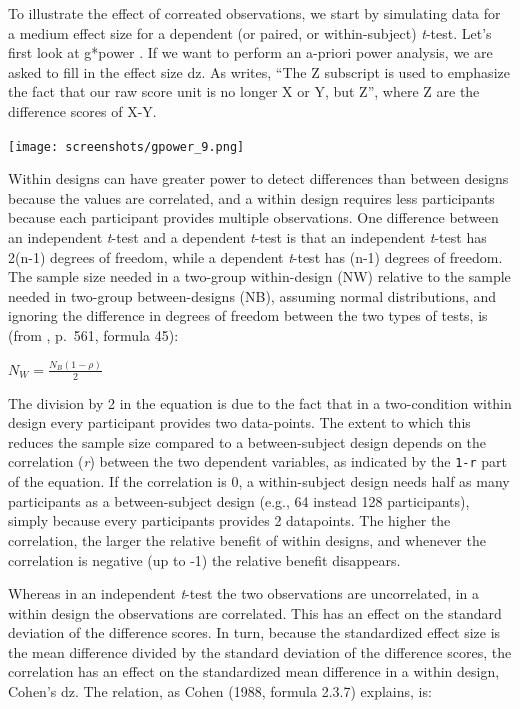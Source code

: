 \documentclass[
]{book}
\begin{document}
To illustrate the effect of correated observations, we start by simulating data for a medium effect size for a dependent (or paired, or within-subject) \emph{t}-test. Let's first look at g*power \citet{faul2007g}. If we want to perform an a-priori power analysis, we are asked to fill in the effect size dz. As \citet{cohen1988spa} writes, ``The Z subscript is used to emphasize the fact that our raw score unit is no longer X or Y, but Z'', where Z are the difference scores of X-Y.

\texttt{[image: screenshots/gpower\_9.png]}

Within designs can have greater power to detect differences than between designs because the values are correlated, and a within design requires less participants because each participant provides multiple observations. One difference between an independent \emph{t}-test and a dependent \emph{t}-test is that an independent \emph{t}-test has 2(n-1) degrees of freedom, while a dependent \emph{t}-test has (n-1) degrees of freedom. The sample size needed in a two-group within-design (NW) relative to the sample needed in two-group between-designs (NB), assuming normal distributions, and ignoring the difference in degrees of freedom between the two types of tests, is (from \citet{maxwell_designing_2004}, p.~561, formula 45):

\(N_{W}=\frac{N_{B}(1-\rho)}{2}\)

The division by 2 in the equation is due to the fact that in a two-condition within design every participant provides two data-points. The extent to which this reduces the sample size compared to a between-subject design depends on the correlation (\emph{r}) between the two dependent variables, as indicated by the \texttt{1-r} part of the equation. If the correlation is 0, a within-subject design needs half as many participants as a between-subject design (e.g., 64 instead 128 participants), simply because every participants provides 2 datapoints. The higher the correlation, the larger the relative benefit of within designs, and whenever the correlation is negative (up to -1) the relative benefit disappears.

Whereas in an independent \emph{t}-test the two observations are uncorrelated, in a within design the observations are correlated. This has an effect on the standard deviation of the difference scores. In turn, because the standardized effect size is the mean difference divided by the standard deviation of the difference scores, the correlation has an effect on the standardized mean difference in a within design, Cohen's dz. The relation, as Cohen (1988, formula 2.3.7) explains, is:
\end{document}
